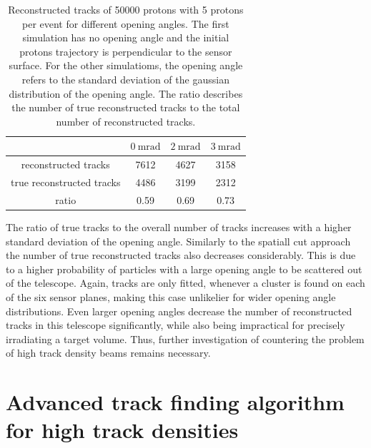 \begin{table}
  \centering
  \begin{tabular}{c | c c c}
    \toprule
     &  $\SI{0}{\milli\radian}$ & $\SI{2}{\milli\radian}$ & $\SI{3}{\milli\radian}$\\
    \midrule
    reconstructed tracks & 7612 & 4627 & 3158  \\
    true reconstructed tracks & 4486 & 3199 & 2312 \\
    ratio & 0.59 & 0.69 & 0.73
  \end{tabular}
  \caption{Reconstructed tracks of 50000 protons with 5 protons per event for different opening angles. The first simulation has no opening angle and the initial protons
  trajectory is perpendicular to the sensor surface. For the other simulatioms, the opening angle refers to the standard deviation of the gaussian distribution of
  the opening angle. The ratio describes the number of true reconstructed tracks to the total number of reconstructed tracks.}
  \label{tab:angle}
\end{table}

The ratio of true tracks to the overall number of tracks increases with a higher standard deviation of the opening angle. Similarly to the spatiall cut approach the
number of true reconstructed tracks also decreases considerably. This is due to a higher probability of particles with a large opening angle to be scattered out of the telescope.
Again, tracks are only fitted, whenever a cluster is found on each of the six sensor planes, making this case unlikelier for wider opening angle distributions.
Even larger opening angles decrease the number of reconstructed tracks in this telescope significantly, while also being impractical for precisely irradiating a target volume.
Thus, further investigation of countering the problem of high track density beams remains necessary.

\section{Advanced track finding algorithm for high track densities}

